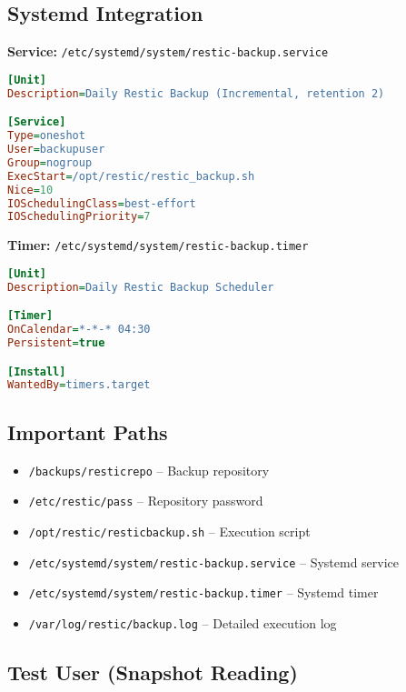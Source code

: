 \documentclass[12pt]{report}
\begin{document}
\subsection*{Systemd Integration}

\textbf{Service:} \texttt{/etc/systemd/system/restic-backup.service}

\begin{lstlisting}[language=ini, caption={Restic systemd Service}]
[Unit]
Description=Daily Restic Backup (Incremental, retention 2)

[Service]
Type=oneshot
User=backupuser
Group=nogroup
ExecStart=/opt/restic/restic_backup.sh
Nice=10
IOSchedulingClass=best-effort
IOSchedulingPriority=7
\end{lstlisting}

\textbf{Timer:} \texttt{/etc/systemd/system/restic-backup.timer}

\begin{lstlisting}[language=ini, caption={Restic systemd Timer}]
[Unit]
Description=Daily Restic Backup Scheduler

[Timer]
OnCalendar=*-*-* 04:30
Persistent=true

[Install]
WantedBy=timers.target
\end{lstlisting}

\subsection*{Important Paths}

\begin{itemize}
    \item \texttt{/backups/resticrepo} – Backup repository
    \item \texttt{/etc/restic/pass} – Repository password
    \item \texttt{/opt/restic/resticbackup.sh} – Execution script
    \item \texttt{/etc/systemd/system/restic-backup.service} – Systemd service
    \item \texttt{/etc/systemd/system/restic-backup.timer} – Systemd timer
    \item \texttt{/var/log/restic/backup.log} – Detailed execution log
\end{itemize}

\subsection*{Test User (Snapshot Reading)}
\end{document}
